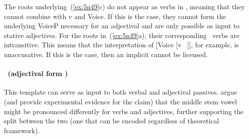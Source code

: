 \begin{exe}
\begin{xlist}
\begin{exe}
\begin{xlist}
\begin{exe}
\begin{exe}
\begin{xlist}
\begin{exe}
\begin{exe}
\begin{xlist}
\begin{exe}
\begin{xlist}
\begin{exe}
\begin{xlist}
\begin{exe}
\begin{xlist}
\begin{xlist}
\begin{exe}
\begin{xlist}
\begin{exe}
\begin{xlist}
\begin{exe}
\begin{exe}
\begin{exe}
\begin{xlist}
\begin{exe}
\begin{exe}
\begin{xlist}
\begin{exe}
\begin{xlist}
\begin{exe}
\begin{xlist}
\begin{exe}
\begin{xlist}
\begin{xlist}
\begin{exe}
\begin{xlist}
\begin{exe}
\begin{xlist}
\begin{exe}
\begin{xlist}
\begin{exe}
\begin{xlist}
\begin{exe}
\begin{exe}
\begin{exe}
\begin{exe}
\begin{exe}
\begin{xlist}
\begin{xlist}
\begin{exe}
\begin{xlist}
\begin{exe}
\begin{xlist}
\begin{exe}
\begin{exe}
\begin{exe}
\begin{xlist}
The roots underlying~(\ref{ex:5n49}c) do not appear as verbs in \tkal, meaning that they cannot combine with v and Voice. If this is the case, they cannot form the underlying VoiceP necessary for an adjectival  and are only possible as input to stative adjectives. For the roots in~(\ref{ex:5n49}a), their corresponding \tkal~verbs are intransitive. This means that the interpretation of [Voice [v ~\!]], for example, is unaccusative. If this is the case, then an implicit  cannot be licensed.


\paragraph*{\tpie~(adjectival form \mpua)}
This template can serve as input to both verbal and adjectival passives. \cite{lakscohen16} argue (and provide experimental evidence for the claim) that the middle stem vowel might be pronounced differently for verbs and adjectives, further supporting the split between the two (one that can be encoded regardless of theoretical framework).


\end{xlist}
\end{exe}
\end{exe}
\end{exe}
\end{xlist}
\end{exe}
\end{xlist}
\end{exe}
\end{xlist}
\end{xlist}
\end{exe}
\end{exe}
\end{exe}
\end{exe}
\end{exe}
\end{xlist}
\end{exe}
\end{xlist}
\end{exe}
\end{xlist}
\end{exe}
\end{xlist}
\end{exe}
\end{xlist}
\end{xlist}
\end{exe}
\end{xlist}
\end{exe}
\end{xlist}
\end{exe}
\end{xlist}
\end{exe}
\end{exe}
\end{xlist}
\end{exe}
\end{exe}
\end{exe}
\end{xlist}
\end{exe}
\end{xlist}
\end{exe}
\end{xlist}
\end{xlist}
\end{exe}
\end{xlist}
\end{exe}
\end{xlist}
\end{exe}
\end{xlist}
\end{exe}
\end{exe}
\end{xlist}
\end{exe}
\end{exe}
\end{xlist}
\end{exe}
\end{xlist}
\end{exe}
